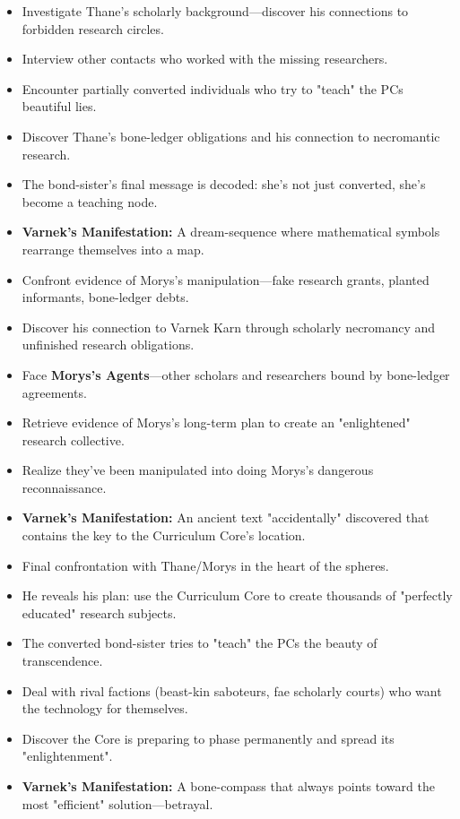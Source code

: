 \documentclass[11pt,twoside]{book}
\newenvironment{adventurebox}[1]{%
  \begin{mdframed}[%
    linewidth=2pt,%
    linecolor=black,%
    backgroundcolor=gray!10,%
    innertopmargin=10pt,%
    innerbottommargin=10pt,%
    innerrightmargin=10pt,%
    innerleftmargin=10pt,%
    frametitle={#1},%
    frametitlefont=\sffamily\bfseries,%
  ]%
}{%
  \end{mdframed}%
}
\newcommand{\sessionbox}[2]{%
  \begin{adventurebox}{Session #1: #2}
}
\newcommand{\endsession}{%
  \end{adventurebox}
}
\begin{document}
\sessionbox{2}{Following the Trail}
\begin{itemize}
    \item Investigate Thane's scholarly background---discover his connections to forbidden research circles.
    \item Interview other contacts who worked with the missing researchers.
    \item Encounter partially converted individuals who try to "teach" the PCs beautiful lies.
    \item Discover Thane's bone-ledger obligations and his connection to necromantic research.
    \item The bond-sister's final message is decoded: she's not just converted, she's become a teaching node.
    \item \textbf{Varnek's Manifestation:} A dream-sequence where mathematical symbols rearrange themselves into a map.
\end{itemize}
\endsession

\sessionbox{3}{The Necromantic Scholar}
\begin{itemize}
    \item Confront evidence of Morys's manipulation---fake research grants, planted informants, bone-ledger debts.
    \item Discover his connection to Varnek Karn through scholarly necromancy and unfinished research obligations.
    \item Face \textbf{Morys's Agents}---other scholars and researchers bound by bone-ledger agreements.
    \item Retrieve evidence of Morys's long-term plan to create an "enlightened" research collective.
    \item Realize they've been manipulated into doing Morys's dangerous reconnaissance.
    \item \textbf{Varnek's Manifestation:} An ancient text "accidentally" discovered that contains the key to the Curriculum Core's location.
\end{itemize}
\endsession

\sessionbox{4}{The Curriculum Chamber}
\begin{itemize}
    \item Final confrontation with Thane/Morys in the heart of the spheres.
    \item He reveals his plan: use the Curriculum Core to create thousands of "perfectly educated" research subjects.
    \item The converted bond-sister tries to "teach" the PCs the beauty of transcendence.
    \item Deal with rival factions (beast-kin saboteurs, fae scholarly courts) who want the technology for themselves.
    \item Discover the Core is preparing to phase permanently and spread its "enlightenment".
    \item \textbf{Varnek's Manifestation:} A bone-compass that always points toward the most "efficient" solution---betrayal.
\end{itemize}
\endsession
\end{document}
